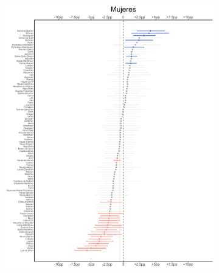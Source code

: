 \begin{figure}
	\centering
	\begin{subfigure}{0.45\textwidth}
	\includegraphics[width = \textwidth]{Figs/Efectos/Efectos_Muj_Modelo_H}
	\end{subfigure}
	~
	\begin{subfigure}{0.45\textwidth}

\end{subfigure}
\end{figure}
